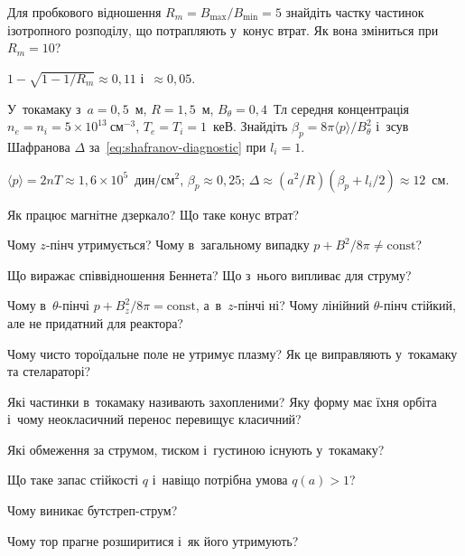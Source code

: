 \begin{problem}\label{prb:LossConeFraction}
	Для пробкового відношення $R_m=B_{\max}/B_{\min}=5$ знайдіть частку частинок ізотропного розподілу,
	що потрапляють у~конус втрат. Як вона зміниться при $R_m=10$?
	\begin{solution}
		$1-\sqrt{1-1/R_m}\approx0{,}11$ і~$\approx0{,}05$.
	\end{solution}
\end{problem}

\begin{problem}\label{prb:ShafranovShift}
	У~токамаку з~$a=0{,}5$~м, $R=1{,}5$~м, $B_\theta=0{,}4$~Тл середня концентрація $n_e=n_i=5\times10^{13}~\mathrm{см}^{-3}$, $T_e=T_i=1$~кеВ.
	Знайдіть $\beta_p=8\pi\langle p\rangle/B_\theta^2$ і~зсув Шафранова $\Delta$ за~\eqref{eq:shafranov-diagnostic} при $l_i=1$.
	\begin{solution}
		$\langle p\rangle=2nT\approx1{,}6\times10^5$~дин/см$^2$, $\beta_p\approx0{,}25$; $\Delta\approx(a^2/R)(\beta_p+l_i/2)\approx12$~см.
	\end{solution}
\end{problem}

\begin{Questions}
\begin{quizlist}
\item Як працює магнітне дзеркало? Що таке конус втрат?

\item Чому $z$-пінч утримується? Чому в~загальному випадку
		  $p+B^2/8\pi\neq\mathrm{const}$?

\item Що виражає співвідношення Беннета? Що з~нього випливає для струму?

\item Чому в~$\theta$-пінчі $p+B_z^2/8\pi=\mathrm{const}$, а~в~$z$-пінчі ні? Чому
		  лінійний $\theta$-пінч стійкий, але не придатний для реактора?

\item Чому чисто тороїдальне поле не утримує плазму? Як це виправляють у~токамаку
		  та стелараторі?

\item Які частинки в~токамаку називають захопленими? Яку форму має їхня орбіта і~чому
		  неокласичний перенос перевищує класичний?

\item Які обмеження за струмом, тиском і~густиною існують у~токамаку?

\item Що таке запас стійкості $q$ і~навіщо потрібна умова $q(a)>1$?

\item Чому виникає бутстреп-струм?

\item Чому тор прагне розширитися і~як його утримують?

\end{quizlist}
\end{Questions}


